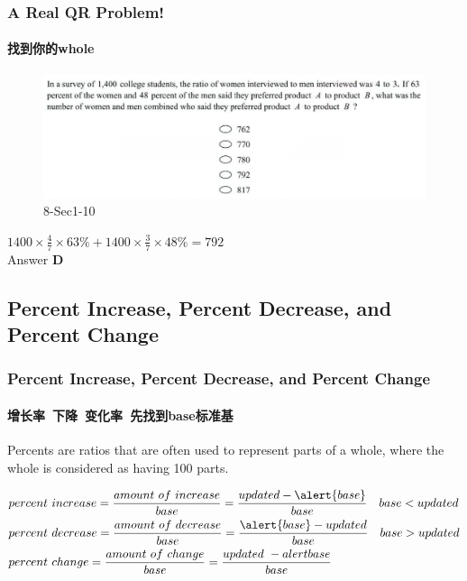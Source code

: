 \documentclass[
	11pt, %
	handout,
]{beamer}
\begin{document}
\begin{frame}
	\frametitle{A Real QR Problem!}
	\framesubtitle{找到你的whole}
	\begin{figure}
		\includegraphics[width=\linewidth]{Percent_Example_Question_1.png}
		\caption{8-Sec1-10}
	\end{figure}
	\pause
$1400 \times \frac{4}{7}\times 63\% + 1400 \times\frac{3}{7}\times 48\% = 792$ \\
\pause
\bigskip
Answer \textbf{D}
\end{frame}


\subsection{Percent Increase, Percent Decrease, and Percent Change}
\begin{frame}
	\frametitle{Percent Increase, Percent Decrease, and Percent Change}
	\framesubtitle{增长率\ 下降\ 变化率\ 先找到base标准基}
	\begin{definition}
		Percents are ratios that are often used to represent parts of a \alert{whole}, where the whole is considered as having 100 \alert{parts}. 
	\end{definition}
	
	\begin{equation*}
		\begin{split}
		&percent\ increase = \frac{amount \ of \ increase}{base} = \frac{updated- \alert{base}}{base} \quad base < updated \\
		&percent\ decrease = \frac{amount \ of \ decrease}{base}  = \frac{\alert{base} - updated}{base} \quad base > updated \\
		&percent\ change = \frac{amount \ of \ change}{base} = \frac{updated\ - alert{base} }{base} \\
		\end{split}
	\end{equation*}
\end{frame}

\end{document}
